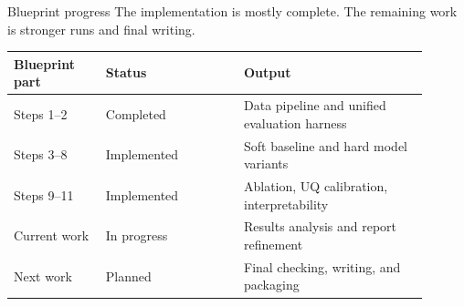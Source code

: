 \documentclass[aspectratio=169,10pt]{beamer}
\newcommand{\smallgray}[1]{\textcolor{projectGray}{#1}}
\begin{document}
\begin{frame}{Blueprint progress}
  \smallgray{The implementation is mostly complete. The remaining work is stronger runs and final writing.}

  \vspace{0.35cm}
  \begin{table}
    \centering
    \begin{tabular}{p{0.20\linewidth}p{0.30\linewidth}p{0.40\linewidth}}
      \toprule
      \textbf{Blueprint part} & \textbf{Status} & \textbf{Output}                              \\
      \midrule
      Steps 1--2              & Completed       & Data pipeline and unified evaluation harness \\
      Steps 3--8              & Implemented     & Soft baseline and hard model variants        \\
      Steps 9--11             & Implemented     & Ablation, UQ calibration, interpretability   \\
      Current work            & In progress     & Results analysis and report refinement       \\
      Next work               & Planned         & Final checking, writing, and packaging       \\
      \bottomrule
    \end{tabular}
  \end{table}
\end{frame}
\end{document}
